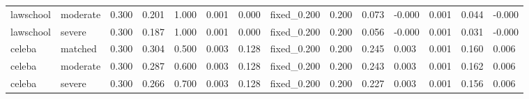 \begin{table}[!t]
{\begin{tabular}{llllllllllllll}
lawschool & moderate & 0.300 & 0.201 & 1.000 & 0.001 & 0.000 & fixed\_0.200 & 0.200 & 0.073 & -0.000 & 0.001 & 0.044 & -0.000 \\
lawschool & severe & 0.300 & 0.187 & 1.000 & 0.001 & 0.000 & fixed\_0.200 & 0.200 & 0.056 & -0.000 & 0.001 & 0.031 & -0.000 \\
celeba & matched & 0.300 & 0.304 & 0.500 & 0.003 & 0.128 & fixed\_0.200 & 0.200 & 0.245 & 0.003 & 0.001 & 0.160 & 0.006 \\
celeba & moderate & 0.300 & 0.287 & 0.600 & 0.003 & 0.128 & fixed\_0.200 & 0.200 & 0.243 & 0.003 & 0.001 & 0.162 & 0.006 \\
celeba & severe & 0.300 & 0.266 & 0.700 & 0.003 & 0.128 & fixed\_0.200 & 0.200 & 0.227 & 0.003 & 0.001 & 0.156 & 0.006 \\
\hline
\end{tabular}
}
\end{table}